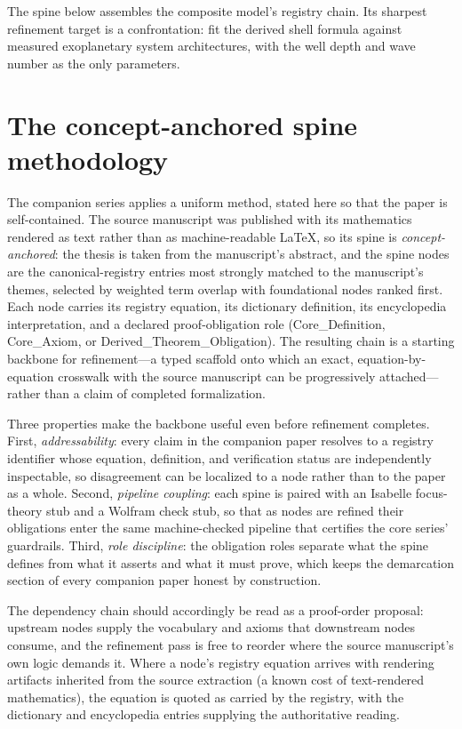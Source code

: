 \documentclass[11pt]{article}
\theoremstyle{remark}
\begin{document}
The spine below assembles the composite model's registry chain. Its sharpest refinement target is a confrontation: fit the derived shell formula against measured exoplanetary system architectures, with the well depth and wave number as the only parameters.

\section{The concept-anchored spine methodology}
\label{sec:method}

The companion series applies a uniform method, stated here so that the paper is self-contained. The source manuscript was published with its mathematics rendered as text rather than as machine-readable LaTeX, so its spine is \emph{concept-anchored}: the thesis is taken from the manuscript's abstract, and the spine nodes are the canonical-registry entries most strongly matched to the manuscript's themes, selected by weighted term overlap with foundational nodes ranked first. Each node carries its registry equation, its dictionary definition, its encyclopedia interpretation, and a declared proof-obligation role (Core\_Definition, Core\_Axiom, or Derived\_Theorem\_Obligation). The resulting chain is a starting backbone for refinement---a typed scaffold onto which an exact, equation-by-equation crosswalk with the source manuscript can be progressively attached---rather than a claim of completed formalization.

Three properties make the backbone useful even before refinement completes. First, \emph{addressability}: every claim in the companion paper resolves to a registry identifier whose equation, definition, and verification status are independently inspectable, so disagreement can be localized to a node rather than to the paper as a whole. Second, \emph{pipeline coupling}: each spine is paired with an Isabelle focus-theory stub and a Wolfram check stub, so that as nodes are refined their obligations enter the same machine-checked pipeline that certifies the core series' guardrails. Third, \emph{role discipline}: the obligation roles separate what the spine defines from what it asserts and what it must prove, which keeps the demarcation section of every companion paper honest by construction.

The dependency chain should accordingly be read as a proof-order proposal: upstream nodes supply the vocabulary and axioms that downstream nodes consume, and the refinement pass is free to reorder where the source manuscript's own logic demands it. Where a node's registry equation arrives with rendering artifacts inherited from the source extraction (a known cost of text-rendered mathematics), the equation is quoted as carried by the registry, with the dictionary and encyclopedia entries supplying the authoritative reading.
\end{document}
